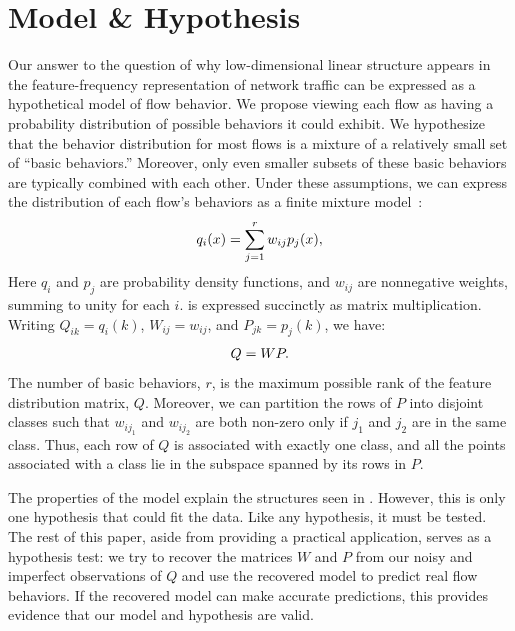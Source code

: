 \documentclass[conference]{IEEEtran}
\begin{document}
\section{Model \& Hypothesis}

Our answer to the question of why low-dimensional linear structure appears in the feature-frequency representation of network traffic can be expressed as a hypothetical model of flow behavior.
We propose viewing each flow as having a probability distribution of possible behaviors it could exhibit.
We hypothesize that the behavior distribution for most flows is a mixture of a relatively small set of ``basic behaviors.''
Moreover, only even smaller subsets of these basic behaviors are typically combined with each other.
Under these assumptions, we can express the distribution of each flow's behaviors as a finite mixture model~\cite{McLachlan00}:
\begin{align}\eqn{mixture-model}
  q_i(x) = \sum_{j=1}^r w_{ij} p_j(x),
\end{align}
Here $q_i$ and $p_j$ are probability density functions, and $w_{ij}$ are nonnegative weights, summing to unity for each $i$.
 is expressed succinctly as matrix multiplication.
Writing $Q_{ik} = q_i(k)$, $W_{ij} = w_{ij}$, and $P_{jk} = p_j(k)$, we have:
\begin{align}\eqn{mixture-model-matrix}
  Q = WP.
\end{align}
The number of basic behaviors, $r$, is the maximum possible rank of the feature distribution matrix, $Q$.
Moreover, we can partition the rows of $P$ into disjoint classes such that $w_{ij_1}$ and $w_{ij_2}$ are both non-zero only if $j_1$ and $j_2$ are in the same class.
Thus, each row of $Q$ is associated with exactly one class, and all the points associated with a class lie in the subspace spanned by its rows in $P$.

The properties of the model explain the structures seen in .
However, this is only one hypothesis that could fit the data.
Like any hypothesis, it must be tested.
The rest of this paper, aside from providing a practical application, serves as a hypothesis test:
we try to recover the matrices $W$ and $P$ from our noisy and imperfect observations of $Q$ and use the recovered model to predict real flow behaviors.
If the recovered model can make accurate predictions, this provides evidence that our model and hypothesis are valid.
\end{document}
